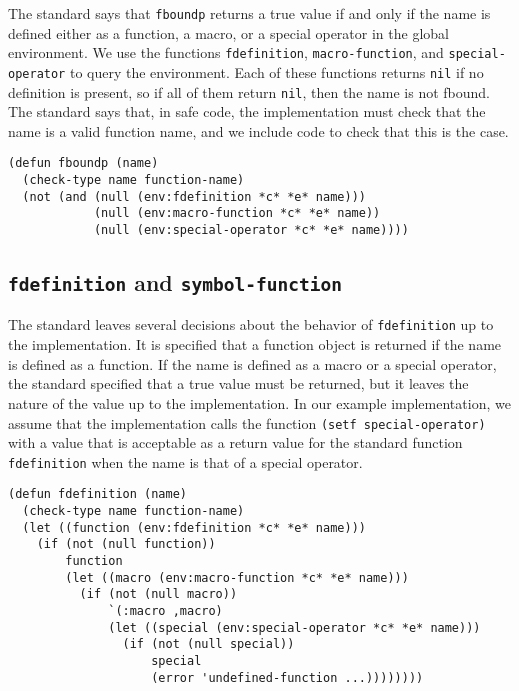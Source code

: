 The standard says that \texttt{fboundp} returns a true value if and
only if the name is defined either as a function, a macro, or a
special operator in the global environment.  We use the \sysname{}
functions \texttt{fdefinition}, \texttt{macro-function}, and
\texttt{special-operator} to query the environment.  Each of these
functions returns \texttt{nil} if no definition is present, so if all
of them return \texttt{nil}, then the name is not fbound.  The
standard says that, in safe code, the implementation must check that
the name is a valid function name, and we include code to check that
this is the case.

\begin{verbatim}
(defun fboundp (name)
  (check-type name function-name)
  (not (and (null (env:fdefinition *c* *e* name)))
            (null (env:macro-function *c* *e* name))
            (null (env:special-operator *c* *e* name))))
\end{verbatim}

\subsection{\texttt{fdefinition} and \texttt{symbol-function}}

The standard leaves several decisions about the behavior of
\texttt{fdefinition} up to the implementation.  It is specified that a
function object is returned if the name is defined as a function.  If
the name is defined as a macro or a special operator, the standard
specified that a true value must be returned, but it leaves the nature
of the value up to the implementation.  In our example implementation,
we assume that the \commonlisp{} implementation calls the \sysname{}
function \texttt{(setf special-operator)} with a value that is
acceptable as a return value for the standard function
\texttt{fdefinition} when the name is that of a special operator.

\begin{verbatim}
(defun fdefinition (name)
  (check-type name function-name)
  (let ((function (env:fdefinition *c* *e* name)))
    (if (not (null function))
        function
        (let ((macro (env:macro-function *c* *e* name)))
          (if (not (null macro))
              `(:macro ,macro)
              (let ((special (env:special-operator *c* *e* name)))
                (if (not (null special))
                    special
                    (error 'undefined-function ...))))))))
\end{verbatim}

